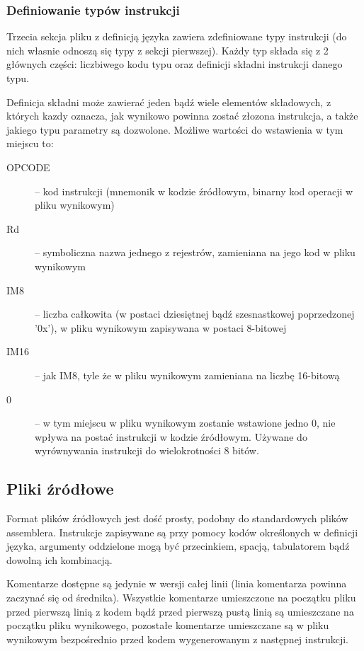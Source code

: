 \documentclass[a4paper,12pt]{report}
\begin{document}
\subsubsection{Definiowanie typów instrukcji}

Trzecia sekcja pliku z definicją języka zawiera zdefiniowane typy instrukcji (do nich własnie odnoszą się typy z sekcji pierwszej). Każdy typ składa się z 2 głównych części: liczbiwego kodu typu oraz definicji składni instrukcji danego typu.

Definicja składni może zawierać jeden bądź wiele elementów składowych, z których kazdy oznacza, jak wynikowo powinna zostać złozona instrukcja, a także jakiego typu parametry są dozwolone. Możliwe wartości do wstawienia w tym miejscu to:
\begin{description}
  \item[OPCODE] -- kod instrukcji (mnemonik w kodzie źródłowym, binarny kod operacji w pliku wynikowym)
  \item[Rd] -- symboliczna nazwa jednego z rejestrów, zamieniana na jego kod w pliku wynikowym
  \item[IM8] -- liczba całkowita (w postaci dziesiętnej bądź szesnastkowej poprzedzonej '0x'), w pliku wynikowym zapisywana w postaci 8-bitowej
  \item[IM16] -- jak IM8, tyle że w pliku wynikowym zamieniana na liczbę 16-bitową
  \item[0] -- w tym miejscu w pliku wynikowym zostanie wstawione jedno 0, nie wpływa na postać instrukcji w kodzie źródłowym. Używane do wyrównywania instrukcji do wielokrotności 8 bitów.
\end{description}

\subsection{Pliki źródłowe}

Format plików źródłowych jest dość prosty, podobny do standardowych plików assemblera. Instrukcje zapisywane są przy pomocy kodów określonych w definicji języka, argumenty oddzielone mogą być przecinkiem, spacją, tabulatorem bądź dowolną ich kombinacją. 

Komentarze dostępne są jedynie w wersji całej linii (linia komentarza powinna zaczynać się od średnika). Wszystkie komentarze umieszczone na początku pliku przed pierwszą linią z kodem bądź przed pierwszą pustą linią są umieszczane na początku pliku wynikowego, pozostałe komentarze umieszczane są w pliku wynikowym bezpośrednio przed kodem wygenerowanym z następnej instrukcji.
\end{document}
